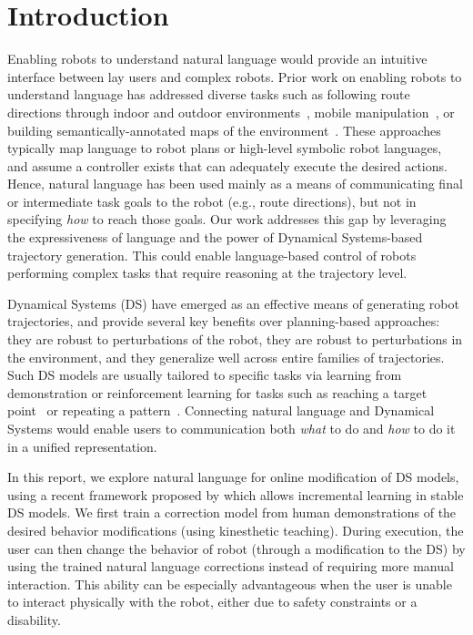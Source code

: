\section{Introduction}
\label{secIntroduction}

Enabling robots to understand natural language would provide an intuitive interface between lay users and complex robots.
Prior work on enabling robots to understand language has addressed diverse tasks such as following route directions through indoor and outdoor environments~\cite{macmahon06, kollar10, matuszek12a, duvallet13, boularias15}, mobile manipulation~\cite{tellex11, howard14a}, or building semantically-annotated maps of the environment~\cite{walter13}.
These approaches typically map language to robot plans or high-level symbolic robot languages, and assume a controller exists that can adequately execute the desired actions.
Hence, natural language has been used mainly as a means of communicating final or intermediate task goals to the robot (e.g., route directions), but not in specifying \emph{how} to reach those goals.
Our work addresses this gap by leveraging the expressiveness of language and the power of Dynamical Systems-based trajectory generation.
This could enable language-based control of robots performing complex tasks that require reasoning at the trajectory level.

Dynamical Systems (DS) have emerged as an effective means of generating robot trajectories, and provide several key benefits over planning-based approaches:
they are robust to perturbations of the robot,
they are robust to perturbations in the environment,
and they generalize well across entire families of trajectories.
Such DS models are usually tailored to specific tasks via learning from demonstration or reinforcement learning for tasks such as reaching a target point~\cite{KhansariZadeh2011,Calinon2012} or repeating a pattern~\cite{Buchli2006}.
Connecting natural language and Dynamical Systems would enable users to communication both \emph{what} to do and \emph{how} to do it in a unified representation.

In this report, we explore natural language for online modification of DS models, using a recent framework proposed by \citet{Kronander2015} which allows incremental learning in stable DS models.
We first train a correction model from human demonstrations of the desired behavior modifications (using kinesthetic teaching).
During execution, the user can then change the behavior of robot (through a modification to the DS) by using the trained natural language corrections instead of requiring more manual interaction.
This ability can be especially advantageous when the user is unable to interact physically with the robot, either due to safety constraints or a disability.


